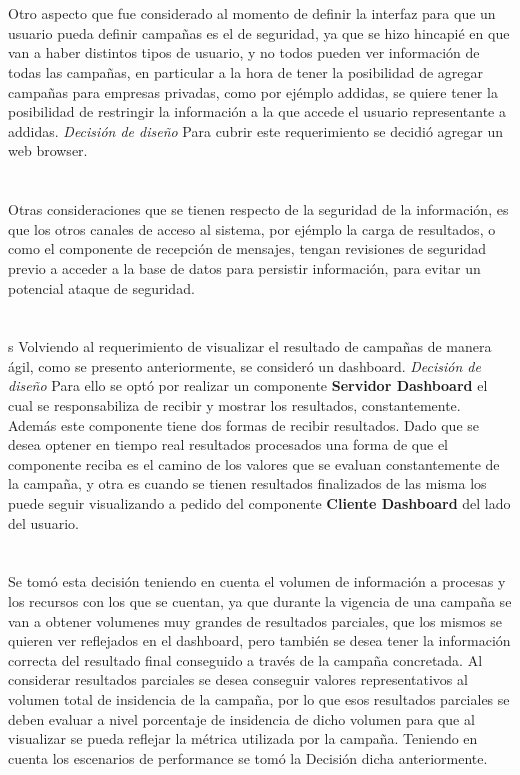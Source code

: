 \documentclass[a4paper, 11pt]{article}
\begin{document}
\\
\\
Otro aspecto que fue considerado al momento de definir la interfaz para que un usuario pueda definir campañas es el de seguridad, ya que se hizo hincapié en que van a haber distintos tipos de usuario, y no todos pueden ver información de todas las campañas, en particular a la hora de tener la posibilidad de agregar campañas para empresas privadas, como por ejémplo addidas, se quiere tener la posibilidad de restringir la información a la que accede el usuario representante a addidas.
\emph{Decisión de diseño} Para cubrir este requerimiento se decidió agregar un web browser. \\
\\
\\
Otras consideraciones que se tienen respecto de la seguridad de la información, es que los otros canales de acceso al sistema, por ejémplo la carga de resultados, o como el componente de recepción de mensajes, tengan revisiones de seguridad previo a acceder a la base de datos para persistir información, para evitar un potencial ataque de seguridad.\\
\\
\\s
Volviendo al requerimiento de visualizar el resultado de campañas de manera ágil, como se presento anteriormente, se consideró un dashboard.
\emph{Decisión de diseño} Para ello se optó por realizar un componente \textbf{Servidor Dashboard} el cual se responsabiliza de recibir y mostrar los resultados, constantemente. Además este componente tiene dos formas de recibir resultados. Dado que se desea optener en tiempo real resultados procesados una forma de que el componente reciba es el camino de los valores que se evaluan constantemente de la campaña, y otra es cuando se tienen resultados finalizados de las misma los puede seguir visualizando a pedido del componente \textbf{Cliente Dashboard} del lado del usuario.\\
\\
\\
Se tomó esta decisión teniendo en cuenta el volumen de información a procesas y los recursos con los que se cuentan, ya que durante la vigencia de una campaña se van a obtener volumenes muy grandes de resultados parciales,  que los mismos se quieren ver reflejados en el dashboard, pero también se desea tener la información correcta del resultado final conseguido a través de la campaña concretada. Al considerar resultados parciales se desea conseguir valores representativos al volumen total de insidencia de la campaña, por lo que esos resultados parciales se deben evaluar a nivel porcentaje de insidencia de dicho volumen para que al visualizar se pueda reflejar la métrica utilizada por la campaña.
Teniendo en cuenta los escenarios de performance se tomó la Decisión dicha anteriormente.
\end{document}
